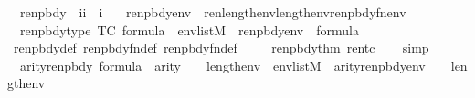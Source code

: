 \begin{isabellebody}
\isanewline
{}\isamarkupfalse%
\isanewline
\ \ renpbdy\ {\isacharcolon}{\kern0pt}{\isacharcolon}{\kern0pt}\ {\isachardoublequoteopen}{\isacharbrackleft}{\kern0pt}i{\isacharcomma}{\kern0pt}i{\isacharbrackright}{\kern0pt}\ {\isasymRightarrow}\ i{\isachardoublequoteclose}\ \isanewline
\ \ {\isachardoublequoteopen}renpbdy{\isacharparenleft}{\kern0pt}{\isasymphi}{\isacharcomma}{\kern0pt}env{\isacharparenright}{\kern0pt}\ {\isacharequal}{\kern0pt}\ ren{\isacharparenleft}{\kern0pt}{\isasymphi}{\isacharparenright}{\kern0pt}{\isacharbackquote}{\kern0pt}{\isacharparenleft}{\kern0pt}{}{\isacharhash}{\kern0pt}{\isacharplus}{\kern0pt}length{\isacharparenleft}{\kern0pt}env{\isacharparenright}{\kern0pt}{\isacharparenright}{\kern0pt}{\isacharbackquote}{\kern0pt}{\isacharparenleft}{\kern0pt}{}{\isacharhash}{\kern0pt}{\isacharplus}{\kern0pt}length{\isacharparenleft}{\kern0pt}env{\isacharparenright}{\kern0pt}{\isacharparenright}{\kern0pt}{\isacharbackquote}{\kern0pt}renpbdy{\isacharunderscore}{\kern0pt}fn{\isacharparenleft}{\kern0pt}env{\isacharparenright}{\kern0pt}{\isachardoublequoteclose}\isanewline
\isanewline
\isanewline
{}\isamarkupfalse%
\isanewline
\ \ renpbdy{\isacharunderscore}{\kern0pt}type\ {\isacharbrackleft}{\kern0pt}TC{\isacharbrackright}{\kern0pt}{\isacharcolon}{\kern0pt}\ {\isachardoublequoteopen}{\isasymphi}{\isasymin}formula\ {\isasymLongrightarrow}\ env{\isasymin}list{\isacharparenleft}{\kern0pt}M{\isacharparenright}{\kern0pt}\ {\isasymLongrightarrow}\ renpbdy{\isacharparenleft}{\kern0pt}{\isasymphi}{\isacharcomma}{\kern0pt}env{\isacharparenright}{\kern0pt}\ {\isasymin}\ formula{\isachardoublequoteclose}\isanewline
%
\isadelimproof
\ \ %
\endisadelimproof
%
\isatagproof
{}\isamarkupfalse%
\ renpbdy{\isacharunderscore}{\kern0pt}def\ renpbdy{\isacharunderscore}{\kern0pt}fn{\isacharunderscore}{\kern0pt}def\ renpbdy{}{\isacharunderscore}{\kern0pt}fn{\isacharunderscore}{\kern0pt}def\isanewline
\ \ \isamarkupfalse%
\ \ renpbdy{}{\isacharunderscore}{\kern0pt}thm{\isacharparenleft}{\kern0pt}{}{\isacharparenright}{\kern0pt}\ ren{\isacharunderscore}{\kern0pt}tc\isanewline
\ \ \isamarkupfalse%
\ simp%
\endisatagproof
{\isafoldproof}%
%
\isadelimproof
\isanewline
%
\endisadelimproof
\isanewline
{}\isamarkupfalse%
\ \ arity{\isacharunderscore}{\kern0pt}renpbdy{\isacharcolon}{\kern0pt}\ {\isachardoublequoteopen}{\isasymphi}{\isasymin}formula\ {\isasymLongrightarrow}\ arity{\isacharparenleft}{\kern0pt}{\isasymphi}{\isacharparenright}{\kern0pt}\ {\isasymle}\ {}\ {\isacharhash}{\kern0pt}{\isacharplus}{\kern0pt}\ length{\isacharparenleft}{\kern0pt}env{\isacharparenright}{\kern0pt}\ {\isasymLongrightarrow}\ env{\isasymin}list{\isacharparenleft}{\kern0pt}M{\isacharparenright}{\kern0pt}\ {\isasymLongrightarrow}\ arity{\isacharparenleft}{\kern0pt}renpbdy{\isacharparenleft}{\kern0pt}{\isasymphi}{\isacharcomma}{\kern0pt}env{\isacharparenright}{\kern0pt}{\isacharparenright}{\kern0pt}\ {\isasymle}\ {}\ {\isacharhash}{\kern0pt}{\isacharplus}{\kern0pt}\ length{\isacharparenleft}{\kern0pt}env{\isacharparenright}{\kern0pt}{\isachardoublequoteclose}\isanewline

\end{isabellebody}
